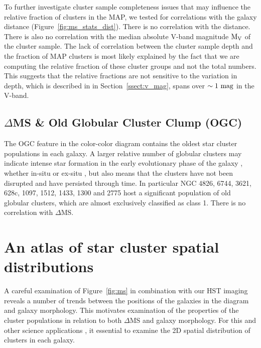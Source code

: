 \documentclass[linenumbers]{aastex63}
\begin{document}
{
To further investigate cluster sample completeness issues that may influence the relative fraction of clusters in the MAP, we tested for correlations with the galaxy distance (Figure~\ref{fig:ms_stats_dist}). There is no correlation with the distance. 
There is also no correlation with the median absolute V-band magnitude ${\rm M_V}$ of the cluster sample. 
The lack of correlation between the cluster sample depth and the fraction of MAP clusters is most likely explained by the fact that we are computing the relative fraction of these cluster groups and not the total numbers. 
This suggests that the relative fractions are not sensitive to the variation in depth, which is described in in Section~\ref{ssect:v_mag}, spans over $\sim 1~{\rm mag}$ in the V-band.} 



\subsection{$\Delta$MS \& Old Globular Cluster Clump (OGC)}
The OGC feature in the color-color diagram contains the oldest star cluster populations in each galaxy. A larger relative number of globular clusters may indicate intense star formation in the early evolutionary phase of the galaxy \citep{BS06}, whether in-situ or ex-situ \citep[and references therein]{CG19}, but also means that the clusters have not been disrupted and have persisted through time. 
In particular NGC 4826, 6744, 3621, 628c, 1097, 1512, 1433, 1300 and 2775 host a significant population of old globular clusters, which are almost exclusively classified as class 1.  There is no correlation with $\Delta$MS.






\section{An atlas of star cluster spatial distributions}\label{sect:spatialdist}

A careful examination of Figure~\ref{fig:ms} in combination with our HST imaging reveals a number of trends between the positions of the galaxies in the diagram and galaxy morphology.  This motivates examination of the properties of the cluster populations in relation to both $\Delta$MS and galaxy morphology.  For this and other science applications \citep[e.g., calculation of correlation functions, constraints on star formation timescales, and comparison with simulations, e.g.,][]{Gouliermis14, grasha_spatial_2015, grasha_hierarchical_2017, grasha_spatial_2019, turner22}, it essential to examine the 2D spatial distribution of clusters in each galaxy.
\end{document}
